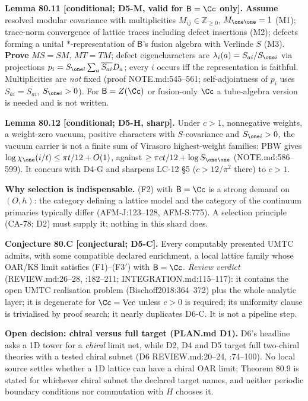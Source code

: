 \textbf{Lemma 80.11 [conditional; D5-M, valid for \(\mathsf B=\Cc\) only].}  \textbf{Assume} resolved modular
covariance with multiplicities \(M_{ij}\in\mathbb Z_{\ge0}\), \(M_{\one\one}=1\) (M1); trace-norm convergence of
lattice traces including defect insertions (M2); defects forming a unital \(*\)-representation of
\(\mathsf B\)'s fusion algebra with Verlinde \(S\) (M3).  \textbf{Prove} \(MS=SM\), \(MT=TM\); defect
eigencharacters are \(\lambda_i(a)=S_{ai}/S_{\one i}\) via projections
\(p_i=S_{\one i}\sum_a\overline{S_{ai}}D_a\); every \(i\) occurs iff the representation is faithful.
Multiplicities are \emph{not} fixed (proof NOTE.md:545--561; self-adjointness of \(p_i\) uses
\(S_{\bar ai}=\overline{S_{ai}}\), \(S_{\one i}>0\)).  For \(\mathsf B=Z(\Cc)\) or fusion-only \(\Cc\) a
tube-algebra version is needed and is not written.

\textbf{Lemma 80.12 [conditional; D5-H, sharp].}  Under \(c>1\), nonnegative weights, a weight-zero vacuum,
positive characters with \(S\)-covariance and \(S_{\one i}>0\), the vacuum carrier is not a finite sum of
Virasoro highest-weight families: PBW gives \(\log\chi_\one(i/t)\le\pi t/12+O(1)\), against
\(\ge\pi ct/12+\log S_{\one\one}\) (NOTE.md:586--599).  It concurs with D4-G and sharpens LC-12 \S5
(\(c>12/\pi^2\) there) to \(c>1\).

\textbf{Why selection is indispensable.}  (F2) with \(\mathsf B=\Cc\) is a strong demand on \((O,h)\): the
category defining a lattice model and the category of the continuum primaries typically differ (AFM-J:123--128,
AFM-S:775).  A selection principle (CA-78; D2) must supply it; nothing in this shard does.

\textbf{Conjecture 80.C [conjectural; D5-C].}  Every computably presented UMTC admits, with some compatible
declared enrichment, a local lattice family whose OAR/KS limit satisfies (F1)--(F3\('\)) with
\(\mathsf B=\Cc\).  \emph{Review verdict} (REVIEW.md:26--28, :182--211; INTEGRATION.md:115--117): it contains the
open UMTC realisation problem (Bischoff2018:364--372) plus the whole analytic layer; it is degenerate for
\(\Cc=\mathrm{Vec}\) unless \(c>0\) is required; its uniformity clause is trivialised by proof search; it
nearly duplicates D6-C.  It is not a pipeline step.

\textbf{Open decision: chiral versus full target (PLAN.md D1).}  D6's headline asks a 1D tower for a
\emph{chiral} limit net, while D2, D4 and D5 target full two-chiral theories with a tested chiral subnet
(D6 REVIEW.md:20--24, :74--100).  No local source settles whether a 1D lattice can have a chiral OAR limit;
Theorem 80.9 is stated for whichever chiral subnet the declared target names, and neither periodic boundary
conditions nor commutation with \(H\) chooses it.

